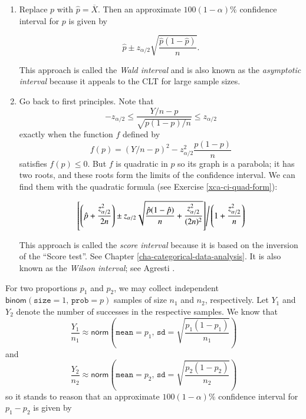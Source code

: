 \documentclass[]{book}
\providecommand{\tightlist}{%
  \setlength{\itemsep}{0pt}\setlength{\parskip}{0pt}}
\numberwithin{equation}{chapter}
\numberwithin{figure}{chapter}
\theoremstyle{plain}
\theoremstyle{definition}
\theoremstyle{remark}
\theoremstyle{definition}
\theoremstyle{definition}
\theoremstyle{remark}
\begin{document}
\begin{enumerate}
\def\labelenumi{\arabic{enumi}.}
\tightlist
\item
  Replace \(p\) with \(\hat{p}=\overline{X}\). Then an approximate
  \(100(1-\alpha)\%\) confidence interval for \(p\) is given by

  \begin{equation}
     \hat{p}\pm z_{\alpha/2}\sqrt{\frac{\hat{p}(1-\hat{p})}{n}}.
     \end{equation}

  This approach is called the \emph{Wald interval} and is also known as
  the \emph{asymptotic interval} because it appeals to the CLT for large
  sample sizes.
\item
  Go back to first principles. Note that \[
     -z_{\alpha/2}\leq\frac{Y/n-p}{\sqrt{p(1-p)/n}}\leq z_{\alpha/2} \]
  exactly when the function \(f\) defined by \[
     f(p)=\left(Y/n-p\right)^{2}-z_{\alpha/2}^{2}\frac{p(1-p)}{n} \]
  satisfies \(f(p)\leq0\). But \(f\) is quadratic in \(p\) so its graph
  is a parabola; it has two roots, and these roots form the limits of
  the confidence interval. We can find them with the quadratic formula
  (see Exercise \ref{xca-ci-quad-form}):

  \begin{equation}
     \left.\left[\left(\hat{p}+\frac{z_{\alpha/2}^{2}}{2n}\right)\pm z_{\alpha/2}\sqrt{\frac{\hat{p}(1-\hat{p})}{n}+\frac{z_{\alpha/2}^{2}}{(2n)^{2}}}\right]\right/ \left(1+\frac{z_{\alpha/2}^{2}}{n}\right)
     \end{equation}

  This approach is called the \emph{score interval} because it is based
  on the inversion of the ``Score test''. See Chapter
  \ref{cha-categorical-data-analysis}. It is also known as the
  \emph{Wilson interval}; see Agresti \autocite{Agresti2002}.
\end{enumerate}

For two proportions \(p_{1}\) and \(p_{2}\), we may collect independent
\(\mathsf{binom}(\mathtt{size}=1,\,\mathtt{prob}=p)\) samples of size
\(n_{1}\) and \(n_{2}\), respectively. Let \(Y_{1}\) and \(Y_{2}\)
denote the number of successes in the respective samples. We know that
\[
\frac{Y_{1}}{n_{1}}\approx\mathsf{norm}\left(\mathtt{mean}=p_{1},\,\mathtt{sd}=\sqrt{\frac{p_{1}(1-p_{1})}{n_{1}}}\right)
\] and \[
\frac{Y_{2}}{n_{2}}\approx\mathsf{norm}\left(\mathtt{mean}=p_{2},\,\mathtt{sd}=\sqrt{\frac{p_{2}(1-p_{2})}{n_{2}}}\right)
\] so it stands to reason that an approximate \(100(1-\alpha)\%\)
confidence interval for \(p_{1}-p_{2}\) is given by
\end{document}
